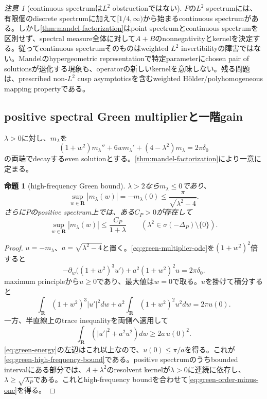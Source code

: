 \documentclass[11pt,a4paper]{ltjsarticle}
\newtheorem{proposition}[theorem]{命題}
\theoremstyle{definition}
\theoremstyle{remark}
\newtheorem{remark}[theorem]{注意}
\newcommand{\RR}{\mathbf R}
\begin{document}
\begin{remark}[continuous spectrumは$L^2$ obstructionではない]\label{rem:continuous-spectrum-solved}
$P$の$L^2$ spectrumには、有限個のdiscrete spectrumに加えて$[1/4,\infty)$から始まるcontinuous spectrumがある\cite{Iwaniec}。しかし\cref{thm:mandel-factorization}はpoint spectrumとcontinuous spectrumを区別せず、spectral measure全体に対して$A+B$のnonnegativityとkernelを決定する。従ってcontinuous spectrumそのものはweighted $L^2$ invertibilityの障害ではない。Mandelのhypergeometric representationで特定parameterにchosen pair of solutionsが退化する現象も、operatorの新しいkernelを意味しない。残る問題は、prescribed non-$L^2$ cusp asymptoticsを含むweighted Hölder/polyhomogeneous mapping propertyである。
\end{remark}

\subsection{positive spectral Green multiplierと一階gain}

$\lambda>0$に対し、$m_\lambda$を
\begin{equation}\label{eq:green-multiplier-ode}
 (1+w^2)m_\lambda''+6wm_\lambda'
 +(4-\lambda^2)m_\lambda
 =2\pi\delta_0
\end{equation}
の両端でdecayするeven solutionとする。\cref{thm:mandel-factorization}により一意に定まる。

\begin{proposition}[high-frequency Green bound]\label{prop:green-multiplier}
$\lambda>2$なら$m_\lambda\le0$であり、
\begin{equation}\label{eq:green-high-frequency-bound}
 \sup_{w\in\RR}|m_\lambda(w)|
 =-m_\lambda(0)
 \le \frac{\pi}{\sqrt{\lambda^2-4}}.
\end{equation}
さらに$P$のpositive spectrum上では、ある$C_P>0$が存在して
\begin{equation}\label{eq:green-order-minus-one}
 \sup_{w\in\RR}|m_\lambda(w)|
 \le \frac{C_P}{1+\lambda}
 \qquad
 (\lambda^2\in\sigma(-\Delta_P)\setminus\{0\}).
\end{equation}
\end{proposition}

\begin{proof}
$u=-m_\lambda$、$a=\sqrt{\lambda^2-4}$と置く。\eqref{eq:green-multiplier-ode}を$(1+w^2)^2$倍すると
\[
 -\partial_w\bigl((1+w^2)^3u'\bigr)
 +a^2(1+w^2)^2u=2\pi\delta_0.
\]
maximum principleから$u\ge0$であり、最大値は$w=0$で取る。$u$を掛けて積分すると
\begin{equation}\label{eq:green-energy}
 \int_{\RR}(1+w^2)^3|u'|^2dw
 +a^2\int_{\RR}(1+w^2)^2u^2dw
 =2\pi u(0).
\end{equation}
一方、半直線上のtrace inequalityを両側へ適用して
\[
 \int_{\RR}(|u'|^2+a^2u^2)dw\ge2a\,u(0)^2.
\]
\eqref{eq:green-energy}の左辺はこれ以上なので、$u(0)\le\pi/a$を得る。これが\eqref{eq:green-high-frequency-bound}である。positive spectrumのうちbounded intervalにある部分では、$A+\lambda^2$のresolvent kernelが$\lambda>0$に連続に依存し、$\lambda\ge\sqrt{\lambda_P}$である。これとhigh-frequency boundを合わせて\eqref{eq:green-order-minus-one}を得る。
\end{proof}
\end{document}
